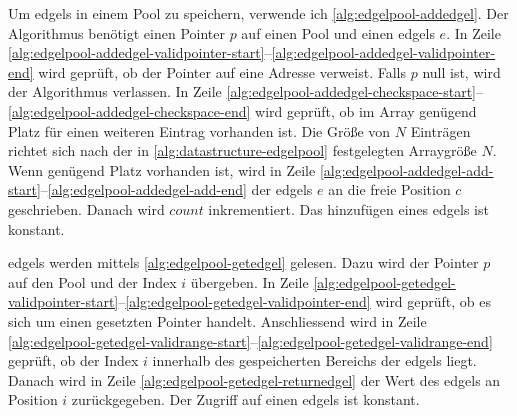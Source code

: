 

Um \gls{edgels} in einem Pool zu speichern, verwende ich \autoref{alg:edgelpool-addedgel}. Der Algorithmus benötigt
 einen Pointer $p$ auf einen Pool und einen \gls{edgels} $e$. In Zeile
 \ref{alg:edgelpool-addedgel-validpointer-start}--\ref{alg:edgelpool-addedgel-validpointer-end} wird geprüft, ob der
 Pointer auf eine Adresse verweist. Falls $p$ null ist, wird der Algorithmus verlassen. In Zeile
 \ref{alg:edgelpool-addedgel-checkspace-start}--\ref{alg:edgelpool-addedgel-checkspace-end} wird geprüft, ob im Array
 genügend Platz für einen weiteren Eintrag vorhanden ist. Die Größe von $N$ Einträgen richtet sich nach der in \autoref{alg:datastructure-edgelpool} festgelegten Arraygröße $N$. Wenn genügend Platz vorhanden ist, wird in Zeile
 \ref{alg:edgelpool-addedgel-add-start}--\ref{alg:edgelpool-addedgel-add-end} der \gls{edgels} $e$ an die freie
 Position $c$ geschrieben. Danach wird $\mathit{count}$ inkrementiert. Das hinzufügen eines \gls{edgels} ist konstant.



\gls{edgels} werden mittels \autoref{alg:edgelpool-getedgel} gelesen. Dazu wird der Pointer $p$ auf den Pool und der
 Index $i$ übergeben. In Zeile
 \ref{alg:edgelpool-getedgel-validpointer-start}--\ref{alg:edgelpool-getedgel-validpointer-end} wird geprüft, ob es
 sich um einen gesetzten Pointer handelt. Anschliessend wird in Zeile
 \ref{alg:edgelpool-getedgel-validrange-start}--\ref{alg:edgelpool-getedgel-validrange-end} geprüft, ob der Index $i$
 innerhalb des gespeicherten Bereichs der \gls{edgels} liegt. Danach wird in Zeile
 \ref{alg:edgelpool-getedgel-returnedgel} der Wert des \gls{edgels} an Position $i$ zurückgegeben. Der Zugriff auf
 einen \gls{edgels} ist konstant.


















